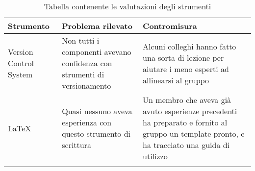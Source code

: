 \documentclass[../piano_di_qualifica.tex]{subfiles}
\begin{document}
\begin{center}
	\begin{longtable}{|p{3cm}|p{4.5cm}|p{4.5cm}|}
		\hline
		\rowcolor{lightgray}
            \textbf{Strumento} & \textbf{Problema rilevato} &  \textbf{Contromisura} \\
            \hline 
            Version Control System & 
            Non tutti i componenti avevano confidenza con strumenti di versionamento &
            Alcuni colleghi hanno fatto una sorta di lezione per aiutare i meno esperti ad allinearsi al gruppo \\
            \hline
            \LaTeX &
            Quasi nessuno aveva esperienza con questo strumento di scrittura &
            Un membro che aveva già avuto esperienze precedenti ha preparato e fornito al gruppo un template pronto, e ha tracciato una guida di utilizzo \\
            \hline
            \rowcolor{white}
\caption{Tabella contenente le valutazioni degli strumenti}
\end{longtable}
\end{center}
\end{document}
